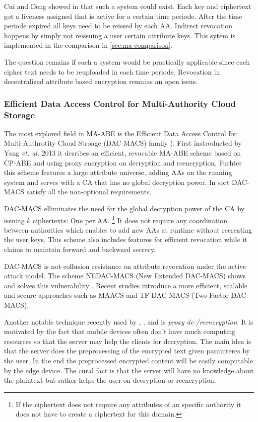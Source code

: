 Cui and Deng showed in \cite{cui2016revocable} that such a system could exist. Each key and ciphertext got a liveness assigned that is active for a certain time periode. After the time periode expired all keys need to be reissed by each \ac{AA}. Indirect revocation happens by simply not reissuing a user certain attribute keys. This sytem is implemented in the comparison in \ref{sec:ma-comparison}.

The question remains if such a system would be practically applicable since each cipher text needs to be reuploaded in each time periode. Revocation in decentralized attribute based encryption remains an open issue.

\subsubsection{Efficient Data Access Control for Multi-Authority Cloud Storage}
The most explored field in \ac{MA-ABE} is the Efficient Data Access Control for Multi-Authrotity Cloud Stroage (\ac{DAC-MACS}) family \cite{yang2013dac}). First instroducted by Yang \textit{et. al.} 2013 it desribes an efficient, revocable \ac{MA-ABE} scheme based on \ac{CP-ABE} and using proxy encryption on decryption and reencryption. Furhter this scheme features a large attribute universe, adding \ac{AA}s on the running system and serves with a \ac{CA} that has no global decryption power. In sort \ac{DAC-MACS} satisfy all the non-optional requirements.

\ac{DAC-MACS} elliminates the need for the global decryption power of the \ac{CA} by issuing $k$ ciphertexts: One per \ac{AA}. \footnote{If the ciphertext does not require any attributes of an specific authority it does not have to create a ciphertext for this domain.} It does not require any coordination between authorities which enables to add new \ac{AA}s at runtime without recreating the user keys. This scheme also includes features for efficient revocation while it claims to maintain forward and backward secrecy.

\ac{DAC-MACS} is not collusion resistance on attribute revocation under the active attack model. The scheme \ac{NEDAC-MACS} (New Extended \ac{DAC-MACS}) shows and solves this vulnerability \cite{wu2017security}. Recent studies introduce a more efficient, scalable and secure approaches such as \ac{MAACS} \cite{li2016secure} and \ac{TF-DAC-MACS} (Two-Factor \ac{DAC-MACS})\cite{li2017two}. 

Another notable technique recently used by \cite{yang2013dac}, \cite{wu2017security}, \cite{li2017two} and \cite{wang2011hierarchical} is \textit{proxy de-/reencryption}. It is motivated by the fact that mobile devices often don't have much computing resources so that the server may help the clients for decryption. The main idea is that the server does the preprocessing of the encrypted text given paramteres by the user. In the end the preprocessed encrypted content will be easily computable by the edge device. The cural fact is that the server will have no knowledge about the plaintext but rather helps the user on decryption or reencryption. 

